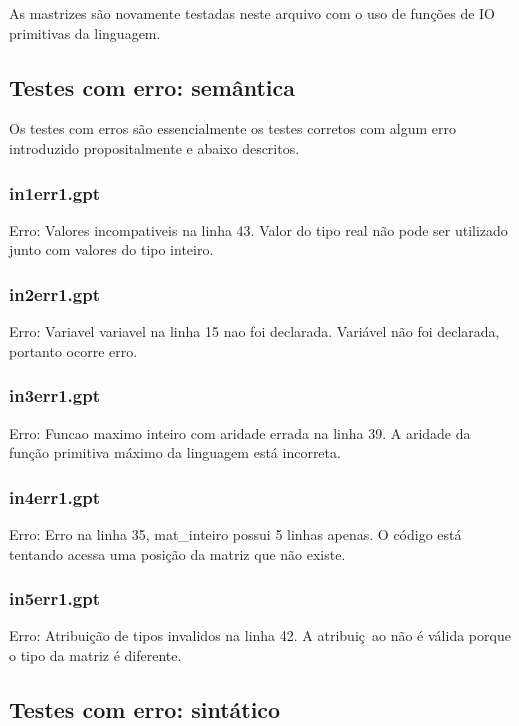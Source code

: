 \documentclass[a4paper,12pt]{report}
\begin{document}
As mastrizes s\~ao novamente testadas neste arquivo com o uso de fun\c{c}\~oes de IO primitivas da linguagem.


\subsection{Testes com erro: sem\^antica}

Os testes com erros s\~ao essencialmente os testes corretos com algum erro 
introduzido propositalmente
e abaixo descritos.

\subsubsection{in1err1.gpt}
Erro: Valores incompativeis na linha 43.
Valor do tipo real n\~ao pode ser utilizado junto com valores do tipo inteiro.

\subsubsection{in2err1.gpt}

Erro: Variavel variavel na linha 15 nao foi declarada.
Vari\'avel n\~ao foi declarada, portanto ocorre erro.

\subsubsection{in3err1.gpt}

Erro: Funcao maximo inteiro com aridade errada na linha 39.
A aridade da fun\c{c}\~ao primitiva m\'aximo da linguagem est\'a incorreta.


\subsubsection{in4err1.gpt}

Erro: Erro na linha 35, mat\_inteiro possui 5 linhas apenas.
O c\'odigo est\'a tentando acessa uma posi\c{c}\~ao da matriz que n\~ao existe.


\subsubsection{in5err1.gpt}

Erro: Atribuição de tipos invalidos na linha 42.
A atribui\c{c}~ao n\~ao \'e v\'alida porque o tipo da matriz \'e diferente.

\subsection{Testes com erro: sint\'atico}
\end{document}
